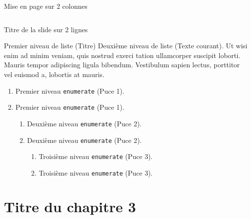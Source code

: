 \documentclass[A4,svgnames,9pt,aspectratio=169]{beamer}
\begin{document}
\begin{frame}{Mise en page sur 2 colonnes}
\begin{columns}
\begin{column}[t]{0.45\textwidth}
         \end{column}
         
  \end{columns}
\end{frame}

\begin{frame}{Titre de la slide \newline sur 2 lignes}
  \begin{block}{Premier niveau de liste (Titre)}
     Deuxième niveau de liste (Texte courant). Ut wisi enim ad minim veniam, quis nostrud exerci tation
     ullamcorper suscipit loborti. Mauris tempor adipiscing ligula bibendum. Vestibulum sapien lectus,
     porttitor vel euismod a, lobortis at mauris.
    \begin{enumerate}
       \item Premier niveau \texttt{enumerate} (Puce 1). 
       \item Premier niveau \texttt{enumerate} (Puce 1). 
       \begin{enumerate}
          \item Deuxième niveau \texttt{enumerate} (Puce 2).
          \item Deuxième niveau \texttt{enumerate} (Puce 2).
          \begin{enumerate}
             \item Troisième niveau \texttt{enumerate} (Puce 3).
             \item Troisième niveau \texttt{enumerate} (Puce 3).
          \end{enumerate}
        \end{enumerate}
      \end{enumerate}
 \end{block}
\end{frame}


\section{Titre du chapitre 3}
\frame{\sectionpage}

\end{document}
